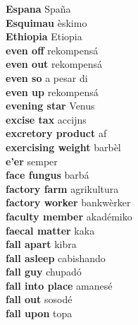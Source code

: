 \textbf{ Espana  } Spaña \\
\textbf{ Esquimau  } èskimo \\
\textbf{ Ethiopia  } Etiopia \\
\textbf{ even off  } rekompensá \\
\textbf{ even out  } rekompensá \\
\textbf{ even so  } a pesar di \\
\textbf{ even up  } rekompensá \\
\textbf{ evening star  } Venus \\
\textbf{ excise tax  } accijns \\
\textbf{ excretory product  } af \\
\textbf{ exercising weight  } barbèl \\
\textbf{ e’er  } semper \\
\textbf{ face fungus  } barbá \\
\textbf{ factory farm  } agrikultura \\
\textbf{ factory worker  } bankwèrker \\
\textbf{ faculty member  } akadémiko \\
\textbf{ faecal matter  } kaka \\
\textbf{ fall apart  } kibra \\
\textbf{ fall asleep  } cabishando \\
\textbf{ fall guy  } chupadó \\
\textbf{ fall into place  } amanesé \\
\textbf{ fall out  } sosodé \\
\textbf{ fall upon  } topa \\
